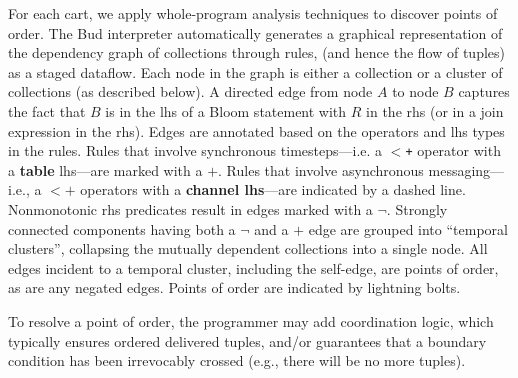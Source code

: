 For each cart, we apply whole-program analysis techniques to discover points of 
order.  The Bud interpreter automatically generates
a graphical representation of the dependency graph of collections through rules,
(and hence the 
flow of tuples) as a staged dataflow.  Each node in the graph is either
a collection or a cluster of collections (as described below).  A directed edge from node $A$ to node $B$ captures the fact that $B$ is in the lhs of a Bloom statement with $R$ in the rhs (or in a join expression in the rhs).  Edges are annotated based on the operators and lhs types in the rules.  Rules that involve synchronous timesteps---i.e. a \texttt{$<$+} operator with a {\bf table} lhs---are marked with a $+$.  Rules that involve asynchronous messaging---i.e., a \texttt{$<+$} operators with a {\bf channel lhs}---are indicated by a dashed line.  Nonmonotonic rhs predicates result in edges marked with a $\lnot$.  Strongly connected components having both a $\lnot$ and a $+$ edge are grouped into ``temporal clusters'', 
collapsing the mutually dependent collections into a single node.  All edges
incident to a temporal cluster, including the self-edge, are points of order,
as are any negated edges.
Points of order are indicated by lightning bolts.

To resolve a point of order, the programmer may add coordination logic, which typically ensures  ordered delivered tuples, and/or guarantees that a boundary condition has been irrevocably crossed (e.g., there will be no more tuples).

